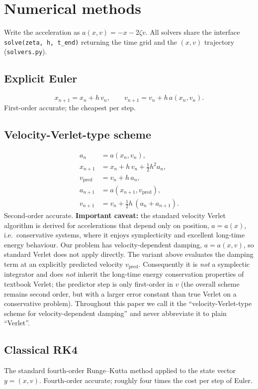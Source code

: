 \documentclass[11pt,a4paper]{article}
\begin{document}
\section{Numerical methods}
Write the acceleration as $a(x,v)=-x-2\zeta v$. All solvers share the
interface \texttt{solve(zeta, h, t\_end)} returning the time grid and
the $(x,v)$ trajectory (\texttt{solvers.py}).

\subsection{Explicit Euler}
\begin{equation}
x_{n+1} = x_n + h\,v_n, \qquad
v_{n+1} = v_n + h\,a(x_n,v_n).
\end{equation}
First-order accurate; the cheapest per step.

\subsection{Velocity-Verlet-type scheme}
\label{sec:verlet}
\begin{align}
a_n &= a(x_n, v_n), \nonumber\\
x_{n+1} &= x_n + h\,v_n + \tfrac12 h^2 a_n, \nonumber\\
v_{\mathrm{pred}} &= v_n + h\,a_n, \\
a_{n+1} &= a(x_{n+1}, v_{\mathrm{pred}}), \nonumber\\
v_{n+1} &= v_n + \tfrac12 h\,(a_n + a_{n+1}). \nonumber
\end{align}
Second-order accurate. \textbf{Important caveat:} the standard velocity
Verlet algorithm is derived for accelerations that depend only on
position, $a=a(x)$, i.e.\ conservative systems, where it enjoys
symplecticity and excellent long-time energy behaviour. Our problem has
velocity-dependent damping, $a=a(x,v)$, so standard Verlet does not
apply directly. The variant above evaluates the damping term at an
explicitly predicted velocity $v_{\mathrm{pred}}$. Consequently it is
\emph{not} a symplectic integrator and does \emph{not} inherit the
long-time energy conservation properties of textbook Verlet; the
predictor step is only first-order in $v$ (the overall scheme remains
second order, but with a larger error constant than true Verlet on a
conservative problem). Throughout this paper we call it the
``velocity-Verlet-type scheme for velocity-dependent damping'' and never
abbreviate it to plain ``Verlet''.

\subsection{Classical RK4}
The standard fourth-order Runge--Kutta method applied to the state
vector $y=(x,v)$. Fourth-order accurate; roughly four times the cost per
step of Euler.
\end{document}
